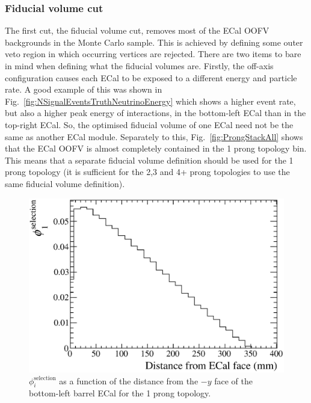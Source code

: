 \subsubsection{Fiducial volume cut}
\label{subsubsec:FVCut}
The first cut, the fiducial volume cut, removes most of the ECal OOFV backgrounds in the Monte Carlo sample.  This is achieved by defining some outer veto region in which occurring vertices are rejected.  There are two items to bare in mind when defining what the fiducial volumes are.  Firstly, the off-axis configuration causes each ECal to be exposed to a different energy and particle rate.  A good example of this was shown in Fig.~\ref{fig:NSignalEventsTruthNeutrinoEnergy} which shows a higher event rate, but also a higher peak energy of interactions, in the bottom-left ECal than in the top-right ECal.  So, the optimised fiducial volume of one ECal need not be the same as another ECal module.  Separately to this, Fig.~\ref{fig:ProngStackAll} shows that the ECal OOFV is almost completely contained in the 1 prong topology bin.  This means that a separate fiducial volume definition should be used for the 1 prong topology (it is sufficient for the 2,3 and 4+ prong topologies to use the same fiducial volume definition).
\newline
\newline
\begin{figure}
  \centering
  \includegraphics[width=12cm]{images/selection/mc_selection/FV_BLB_1Prong_NegY.eps}
  \caption{$\phi_i^{\textrm{selection}}$ as a function of the distance from the $-y$ face of the bottom-left barrel ECal for the 1 prong topology.}
  \label{fig:FVBLB1ProngNegY}
\end{figure}
